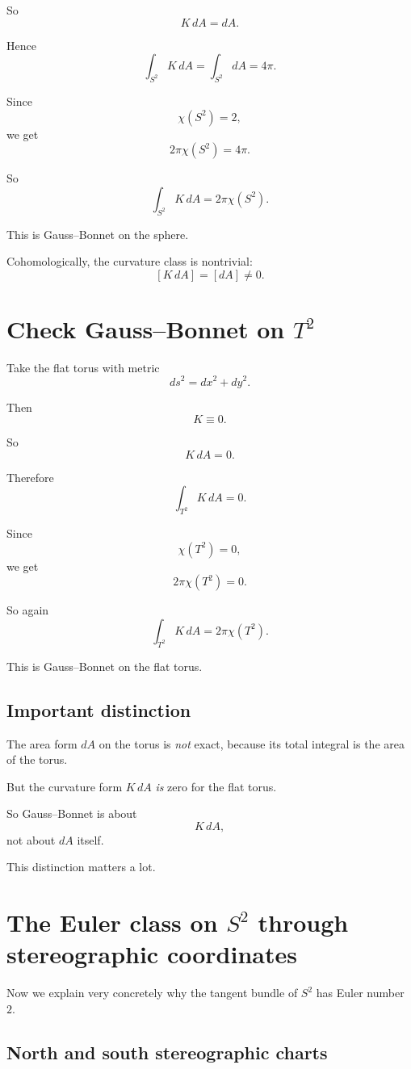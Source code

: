 \documentclass[11pt]{article}
\begin{document}
	So
	\[
	K\,dA=dA.
	\]
	
	Hence
	\[
	\int_{S^2}K\,dA
	=
	\int_{S^2}dA
	=
	4\pi.
	\]
	
	Since
	\[
	\chi(S^2)=2,
	\]
	we get
	\[
	2\pi\chi(S^2)=4\pi.
	\]
	
	So
	\[
	\int_{S^2}K\,dA=2\pi\chi(S^2).
	\]
	
	This is Gauss--Bonnet on the sphere.
	
	Cohomologically, the curvature class is nontrivial:
	\[
	[K\,dA]=[dA]\neq 0.
	\]
	
	\section{Check Gauss--Bonnet on \(T^2\)}
	
	Take the flat torus with metric
	\[
	ds^2=dx^2+dy^2.
	\]
	
	Then
	\[
	K\equiv 0.
	\]
	
	So
	\[
	K\,dA=0.
	\]
	
	Therefore
	\[
	\int_{T^2}K\,dA=0.
	\]
	
	Since
	\[
	\chi(T^2)=0,
	\]
	we get
	\[
	2\pi\chi(T^2)=0.
	\]
	
	So again
	\[
	\int_{T^2}K\,dA=2\pi\chi(T^2).
	\]
	
	This is Gauss--Bonnet on the flat torus.
	
	\subsection{Important distinction}
	
	The area form \(dA\) on the torus is \emph{not} exact, because its total integral is the area of the torus.
	
	But the curvature form \(K\,dA\) \emph{is} zero for the flat torus.
	
	So Gauss--Bonnet is about
	\[
	K\,dA,
	\]
	not about \(dA\) itself.
	
	This distinction matters a lot.
	
	\section{The Euler class on \(S^2\) through stereographic coordinates}
	
	Now we explain very concretely why the tangent bundle of \(S^2\) has Euler number \(2\).
	
	\subsection{North and south stereographic charts}
	
\end{document}
